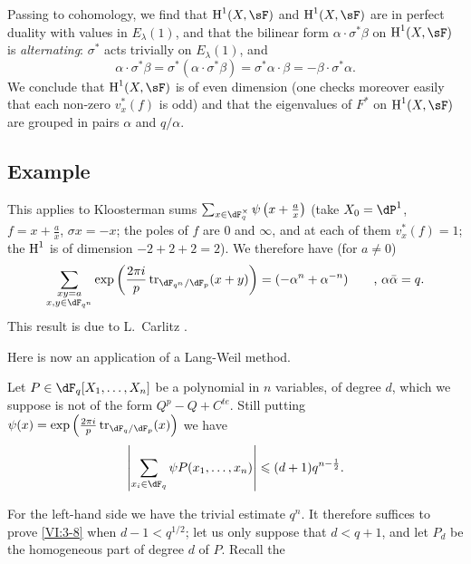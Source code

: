 Passing to cohomology, we find that $\h^1(X,\sF)$ and $\h^1(X,\sF)$ are in
perfect duality with values in $E_\lambda(1)$, and that the bilinear form
$\alpha\cdot \sigma^\ast\beta$ on $\h^1(X,\sF)$ is \emph{alternating}:
$\sigma^\ast$ acts trivially on $E_\lambda(1)$, and 
\[
  \alpha\cdot \sigma^\ast \beta = \sigma^\ast(\alpha\cdot \sigma^\ast \beta) = \sigma^\ast \alpha\cdot \beta = -\beta\cdot \sigma^\ast \alpha \text{.} 
\]
We conclude that $\h^1(X,\sF)$ is of even dimension (one checks moreover
easily that each non-zero $v_x^\ast(f)$ is odd) and that the eigenvalues
of $F^\ast$ on $\h^1(X,\sF)$ are grouped in pairs $\alpha$ and
$q/\alpha$. 





\subsection{Example}\label{VI:3-7}

This applies to Kloosterman sums
$\sum_{x\in \dF_q^\times} \psi\left(x+\frac a x\right)$ (take
$X_0=\dP^1$, $f=x+\frac a x$, $\sigma x=-x$; the poles of $f$ are $0$ and
$\infty$, and at each of them $v_x^\ast(f)=1$; the $\operatorname{H}^1$ is of dimension
$-2+2+2=2$). We therefore have (for $a\ne 0$) 
\[
  \sum_{\substack{x y=a \\ x,y\in \dF_{q^n}}} \exp\left(\frac{2\pi i}{p} \tr_{\dF_{q^n}/\dF_p}(x+y)\right) = (-\alpha^n+\alpha^{-n}) \qquad \text{, }\alpha\bar \alpha = q \text{.} 
\]
This result is due to L.\ Carlitz \cite{ca69}.

Here is now an application of a Lang-Weil method. 





\begin{proposition_}\label{VI:3-8}
Let $P\in \dF_q[X_1,\dots,X_n]$ be a polynomial in $n$ variables, of degree
$d$, which we suppose is not of the form $Q^p-Q+C^{te}$. Still putting
$\psi(x) = \exp\left(\frac{2\pi i}{p} \tr_{\dF_q/\dF_p}(x)\right)$ we have
\[
  \left|\sum_{x_i\in \dF_q} \psi P(x_1,\dots,x_n)\right| \leqslant (d+1) q^{n-\frac 1 2} \text{.}
\]
\end{proposition_}

For the left-hand side we have the trivial estimate $q^n$. It therefore suffices to
prove \ref{VI:3-8} when $d-1<q^{1/2}$; let us only suppose that
$d<q+1$, and let $P_d$ be the homogeneous part of degree $d$ of $P$. Recall the 






